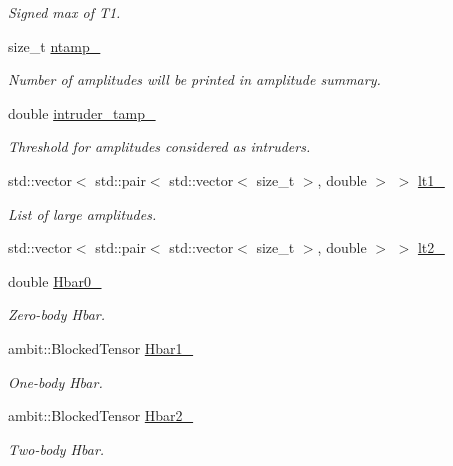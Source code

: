 \begin{DoxyCompactItemize}
\begin{DoxyCompactList}\small\item\em Signed max of T1. \end{DoxyCompactList}\item 
size\+\_\+t \mbox{\hyperlink{classforte_1_1_d_s_r_g___m_r_p_t_a6d8ad3ce1ec3e27840be359d8a0af410}{ntamp\+\_\+}}
\begin{DoxyCompactList}\small\item\em Number of amplitudes will be printed in amplitude summary. \end{DoxyCompactList}\item 
double \mbox{\hyperlink{classforte_1_1_d_s_r_g___m_r_p_t_a3f7598c38822b0c248df73637426215c}{intruder\+\_\+tamp\+\_\+}}
\begin{DoxyCompactList}\small\item\em Threshold for amplitudes considered as intruders. \end{DoxyCompactList}\item 
std\+::vector$<$ std\+::pair$<$ std\+::vector$<$ size\+\_\+t $>$, double $>$ $>$ \mbox{\hyperlink{classforte_1_1_d_s_r_g___m_r_p_t_a23960b3827edcf832dcff5bec6d23a2f}{lt1\+\_\+}}
\begin{DoxyCompactList}\small\item\em List of large amplitudes. \end{DoxyCompactList}\item 
std\+::vector$<$ std\+::pair$<$ std\+::vector$<$ size\+\_\+t $>$, double $>$ $>$ \mbox{\hyperlink{classforte_1_1_d_s_r_g___m_r_p_t_ade1af147df32093d8ef9901eda6f741a}{lt2\+\_\+}}
\item 
double \mbox{\hyperlink{classforte_1_1_d_s_r_g___m_r_p_t_afc9bd5e06677303c356b8ccef89d64ff}{Hbar0\+\_\+}}
\begin{DoxyCompactList}\small\item\em Zero-\/body Hbar. \end{DoxyCompactList}\item 
ambit\+::\+Blocked\+Tensor \mbox{\hyperlink{classforte_1_1_d_s_r_g___m_r_p_t_a3fec90a2fa29718e28cf04c5a9ceb056}{Hbar1\+\_\+}}
\begin{DoxyCompactList}\small\item\em One-\/body Hbar. \end{DoxyCompactList}\item 
ambit\+::\+Blocked\+Tensor \mbox{\hyperlink{classforte_1_1_d_s_r_g___m_r_p_t_a8253974db2a39ee31ad379421b000881}{Hbar2\+\_\+}}
\begin{DoxyCompactList}\small\item\em Two-\/body Hbar. \end{DoxyCompactList}\item 

\end{DoxyCompactItemize}
